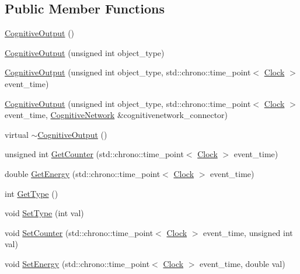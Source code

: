 \subsection*{Public Member Functions}
\begin{DoxyCompactItemize}
\item 
\hyperlink{class_cognitive_output_a743042cff5c36a76cd975767358e1bbf}{Cognitive\+Output} ()
\item 
\hyperlink{class_cognitive_output_af1fca516a8a90913760e8ac5431f6f70}{Cognitive\+Output} (unsigned int object\+\_\+type)
\item 
\hyperlink{class_cognitive_output_a4751f511d329c66ed80a3c127e5e9e6d}{Cognitive\+Output} (unsigned int object\+\_\+type, std\+::chrono\+::time\+\_\+point$<$ \hyperlink{universe_8h_a0ef8d951d1ca5ab3cfaf7ab4c7a6fd80}{Clock} $>$ event\+\_\+time)
\item 
\hyperlink{class_cognitive_output_a9874901c7b49a6bb495d34c84fdbf651}{Cognitive\+Output} (unsigned int object\+\_\+type, std\+::chrono\+::time\+\_\+point$<$ \hyperlink{universe_8h_a0ef8d951d1ca5ab3cfaf7ab4c7a6fd80}{Clock} $>$ event\+\_\+time, \hyperlink{class_cognitive_network}{Cognitive\+Network} \&cognitivenetwork\+\_\+connector)
\item 
virtual \hyperlink{class_cognitive_output_aefe310a8577684210d82236033791036}{$\sim$\+Cognitive\+Output} ()
\item 
unsigned int \hyperlink{class_cognitive_output_a73efe6441491eb54df2f4dbd78b3903e}{Get\+Counter} (std\+::chrono\+::time\+\_\+point$<$ \hyperlink{universe_8h_a0ef8d951d1ca5ab3cfaf7ab4c7a6fd80}{Clock} $>$ event\+\_\+time)
\item 
double \hyperlink{class_cognitive_output_abb923045db565ecdbac431469217cebf}{Get\+Energy} (std\+::chrono\+::time\+\_\+point$<$ \hyperlink{universe_8h_a0ef8d951d1ca5ab3cfaf7ab4c7a6fd80}{Clock} $>$ event\+\_\+time)
\item 
int \hyperlink{class_cognitive_output_ac5ead5e6a98556d6779eda5679b69594}{Get\+Type} ()
\item 
void \hyperlink{class_cognitive_output_ac76f41ab3b65ea466e9e2999270f2e5a}{Set\+Type} (int val)
\item 
void \hyperlink{class_cognitive_output_a087e8bdab9eb6020dbbe6d47f524c8b6}{Set\+Counter} (std\+::chrono\+::time\+\_\+point$<$ \hyperlink{universe_8h_a0ef8d951d1ca5ab3cfaf7ab4c7a6fd80}{Clock} $>$ event\+\_\+time, unsigned int val)
\item 
void \hyperlink{class_cognitive_output_acc16ca3521689776ecd68255ece1e671}{Set\+Energy} (std\+::chrono\+::time\+\_\+point$<$ \hyperlink{universe_8h_a0ef8d951d1ca5ab3cfaf7ab4c7a6fd80}{Clock} $>$ event\+\_\+time, double val)

\end{DoxyCompactItemize}
